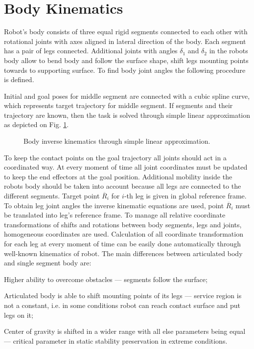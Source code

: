 \documentclass{ws-procs9x6}
\begin{document}
\section{Body Kinematics}
Robot's body consists of three equal rigid segments connected to each other with rotational joints with axes aligned in lateral direction of the body. Each segment has a pair of legs connected. Additional joints with angles $\delta_1$ and $\delta_2$ in the robots body allow to bend body and follow the surface shape, shift legs mounting points towards to supporting surface. 
To find body joint angles the following procedure is defined.

Initial and goal poses for middle segment are connected with a cubic spline curve, which represents target trajectory for middle segment. If segments and their trajectory are known, then the task is solved through simple linear approximation as depicted on Fig. \ref{aba:spline}.

\begin{figure}
  \begin{center}
  \end{center}
  \caption{Body inverse kinematics through simple linear approximation.}
  \label{aba:spline}
\end{figure}

To keep the contact points on the goal trajectory all joints should act in a coordinated way. At every moment of time all joint coordinates must be updated to keep the end effectors at the goal position. Additional mobility inside the robots body should be taken into account because all legs are connected to the different segments.  Target point $\overline{R}_i$ for $i$-th leg is given in global reference frame. To obtain leg joint angles the inverse kinematic equations are used, point $\overline{R}_i$ must be translated into leg’s reference frame. To manage all relative coordinate transformations of shifts and rotations between body segments, legs and joints, homogeneous coordinates are used. Calculation of all coordinate transformation for each leg at every moment of time can be easily done automatically through well-known kinematics of robot.
The main differences between articulated body and single segment body are:
\begin{itemlist}
  \item Higher ability to overcome obstacles –-- segments follow the surface;
  \item Articulated body is able to shift mounting points of its legs –-- service region is not a constant, i.e. in some conditions robot can reach contact surface and put legs on it;
  \item Center of gravity is shifted in a wider range with all else parameters being equal –-- critical parameter in static stability preservation in extreme conditions.
\end{itemlist}
\end{document}
